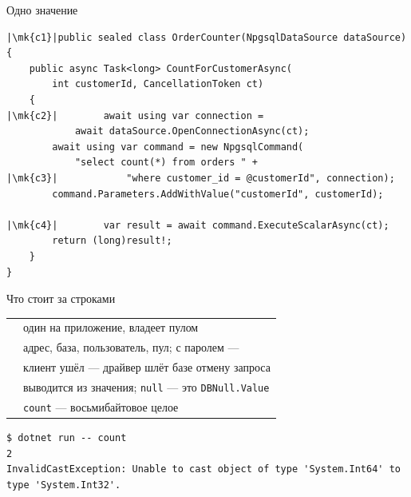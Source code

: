 \documentclass[aspectratio=169,10pt,t]{beamer}
\newcommand{\codexs}{\ttfamily\fontsize{7.0}{8.3}\selectfont}
\newcommand{\termsm}{\ttfamily\fontsize{6.6}{7.9}\selectfont}
\newcommand{\mk}[1]{\tikz[remember picture,overlay]\coordinate (#1) at (0,0.55ex);}
\begin{document}
\begin{frame}[fragile]{Одно значение}
  \vspace{0.3em}
\begin{lstlisting}[style=csharp,basicstyle=\codexs,escapechar=|]
|\mk{c1}|public sealed class OrderCounter(NpgsqlDataSource dataSource)
{
    public async Task<long> CountForCustomerAsync(
        int customerId, CancellationToken ct)
    {
|\mk{c2}|        await using var connection =
            await dataSource.OpenConnectionAsync(ct);
        await using var command = new NpgsqlCommand(
            "select count(*) from orders " +
|\mk{c3}|            "where customer_id = @customerId", connection);
        command.Parameters.AddWithValue("customerId", customerId);

|\mk{c4}|        var result = await command.ExecuteScalarAsync(ct);
        return (long)result!;
    }
}
\end{lstlisting}

\end{frame}

\begin{frame}[fragile]{Что стоит за строками}
  \slidetop
  {\renewcommand{\arraystretch}{1.4}\small
  \begin{tabular}{@{}L{3.9cm}L{8.9cm}@{}}
       & один на приложение, владеет пулом \\
     & адрес, база, пользователь, пул; с паролем
      ---  \\
                 & клиент ушёл --- драйвер шлёт базе отмену
      запроса \\
         & выводится из значения; \texttt{null} ---
      это \texttt{DBNull.Value} \\
       & \texttt{count} --- восьмибайтовое целое \\
  \end{tabular}}

\begin{lstlisting}[style=term,basicstyle=\termsm]
$ dotnet run -- count
2
InvalidCastException: Unable to cast object of type 'System.Int64' to type 'System.Int32'.
\end{lstlisting}

\end{frame}
\end{document}
